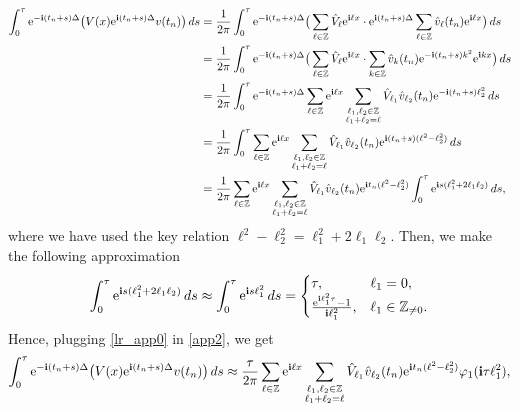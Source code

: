 \documentclass[a4paper]{amsart}
\begin{document}
\begin{align}
    \int_{0}^{\tau}{\rm e}^{-{\bf i}(t_n+s)\Delta}\big(V(x){\rm e}^{{\bf i}(t_n+s)\Delta}v(t_n)\big)\,ds
    &=\frac{1}{2\pi} \int_{0}^{\tau}{\rm e}^{-{\bf i}(t_n+s)\Delta}\big(\displaystyle\sum_{\ell\in \mathbb{Z}}\hat{V}_\ell {\rm e}^{{\bf i}\ell x}\cdot {\rm e}^{{\bf i}(t_n+s)\Delta}\displaystyle\sum_{\ell\in\mathbb{Z}}\hat{v}_\ell(t_n) {\rm e}^{{\bf i}\ell x}\big)\,ds\notag \\
    &=\frac{1}{2\pi} \int_{0}^{\tau}{\rm e}^{-{\bf i}(t_n+s)\Delta}\big(\displaystyle\sum_{\ell\in\mathbb{Z}}\hat{V}_\ell {\rm e}^{{\bf i}\ell x}\cdot \displaystyle\sum_{k\in \mathbb{Z}}\hat{v}_k (t_n) {\rm e}^{-{\bf i}(t_n+s)k^2}{\rm e}^{{\bf i}k x}\big)\,ds\notag \\
    &=\frac{1}{2\pi} \int_{0}^{\tau}{\rm e}^{-{\bf i}(t_n+s)\Delta}\displaystyle\sum_{\ell\in\mathbb{Z}}{\rm e}^{{\bf i}\ell x}\displaystyle\sum_{\substack{\ell_1,\ell_2\in\mathbb{Z}\\ \ell_1+\ell_2=\ell}}\hat{V}_{\ell_1} \hat{v}_{\ell_2}(t_n) {\rm e}^{-{\bf i}(t_n+s)\ell_2^2}\,ds\notag \\
    &=\frac{1}{2\pi} \int_{0}^{\tau}\displaystyle\sum_{\ell\in\mathbb{Z}}{\rm e}^{{\bf i}\ell x}\displaystyle\sum_{\substack{\ell_1,\ell_2\in\mathbb{Z}\\ \ell_1+\ell_2=\ell}}\hat{V}_{\ell_1} \hat{v}_{\ell_2}(t_n) {\rm e}^{{\bf i}(t_n+s)(\ell^2-\ell_2^2)}\,ds\notag \\
&=\frac{1}{2\pi} \displaystyle\sum_{\ell\in\mathbb{Z}}{\rm e}^{{\bf i}\ell x}\displaystyle\sum_{\substack{\ell_1,\ell_2\in\mathbb{Z}\\ \ell_1+\ell_2=\ell}}\hat{V}_{\ell_1} \hat{v}_{\ell_2}(t_n){\rm e}^{{\bf i}t_n(\ell^2-\ell_2^2)}\int_{0}^{\tau} {\rm e}^{{\bf i}s(\ell_1^2+2\ell_1 \ell_2)}\,ds \label{app2},
\end{align}
where we have used the key relation $\ell^2-\ell_2^2=\ell_1^2+2\ell_1 \ell_2$. Then, we make the following approximation
\begin{equation}
    \label{lr_app0}
\int_0^\tau {\rm e}^{{\bf i}s(\ell_1^2+2\ell_1 \ell_2)}\,ds\approx \int_0^\tau {\rm e}^{{\bf i}s \ell_1^2}\,ds = 
\begin{cases}
    \tau, & \ell_1=0,\\
    \frac{{\rm e}^{{\bf i}\ell_1^2\tau}-1}{{\bf i}\ell_1^2}, &\ell_1\in\mathbb{Z}_{\ne 0}.
\end{cases}
\end{equation}
Hence, plugging \eqref{lr_app0} in \eqref{app2}, we get
\begin{equation}
\label{lr_app1}
\int_{0}^{\tau}{\rm e}^{-{\bf i}(t_n+s)\Delta}\big(V(x){\rm e}^{{\bf i}(t_n+s)\Delta}v(t_n)\big)\,ds\approx \frac{\tau}{2\pi}
\displaystyle\sum_{\ell\in\mathbb{Z}}{\rm e}^{{\bf i}\ell x}\displaystyle\sum_{\substack{\ell_1,\ell_2\in\mathbb{Z}\\ \ell_1+\ell_2=\ell}}\hat{V}_{\ell_1} \hat{v}_{\ell_2}(t_n){\rm e}^{{\bf i}t_n(\ell^2-\ell_2^2)}\varphi_1({\bf i} \tau \ell_1^2),
\end{equation}
\end{document}
